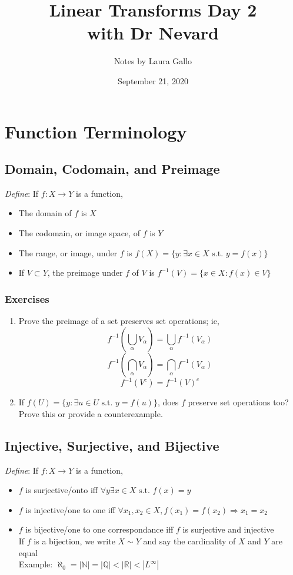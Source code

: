 \documentclass{article}
\title{Linear Transforms Day 2 \\ with Dr Nevard}
\author{Notes by Laura Gallo}
\date{September 21, 2020}
\newcommand{\st}{\text{ s.t. }}
\begin{document}
\maketitle

\section{Function Terminology}
\subsection{Domain, Codomain, and Preimage}
\emph{Define}: If $f: X\rightarrow Y$ is a function,
\begin{itemize}[label=--]
	\item The domain of $f$ is $X$
	\item The codomain, or image space, of $f$ is $Y$
	\item The range, or image, under $f$ is $f(X)=\{y:\exists x\in X \st y=f(x)\}$
	\item If $V \subset Y$, the preimage under $f$ of $V$ is $f^{-1}(V)=\{x\in X:f(x)\in V\}$
\end{itemize}

\subsubsection{Exercises}
\begin{enumerate}
	\item Prove the preimage of a set preserves set operations; ie,
		$$f^{-1}\left(\bigcup_\alpha V_\alpha\right)=\bigcup_\alpha f^{-1}(V_\alpha)$$
		$$f^{-1}\left(\bigcap_\alpha V_\alpha\right)=\bigcap_\alpha f^{-1}(V_\alpha)$$
		$$f^{-1}(V^c)=f^{-1}(V)^c$$

	\item If $f(U)=\{y:\exists u\in U \st y=f(u)\}$, does $f$ preserve set operations too? Prove this or provide a counterexample.
\end{enumerate}

\subsection{Injective, Surjective, and Bijective}
\emph{Define}: If $f: X\rightarrow Y$ is a function,
\begin{itemize}[label=--]
	\item $f$ is surjective/onto iff $\forall y \exists x \in X \st f(x)=y$
	\item $f$ is injective/one to one iff $\forall x_1,x_2 \in X, f(x_1)=f(x_2) \Rightarrow x_1=x_2$
	\item $f$ is bijective/one to one correspondance iff $f$ is surjective and injective \\
		If $f$ is a bijection, we write $X \sim Y$ and say the cardinality of $X$ and $Y$ are equal \\
		Example: $\aleph_0=|\mathbb{N}|=|\mathbb{Q}|<|\mathbb{R}|<|L^\infty |$
\end{itemize}
\end{document}
